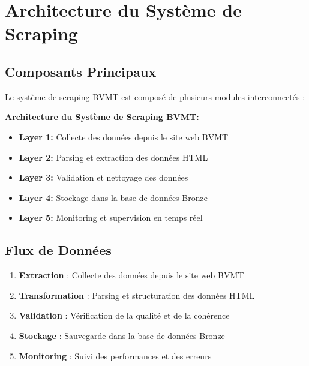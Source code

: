 \section{Architecture du Système de Scraping}

\subsection{Composants Principaux}

Le système de scraping BVMT est composé de plusieurs modules interconnectés :


\textbf{Architecture du Système de Scraping BVMT:}
\begin{itemize}
    \item \textbf{Layer 1:} Collecte des données depuis le site web BVMT
    \item \textbf{Layer 2:} Parsing et extraction des données HTML
    \item \textbf{Layer 3:} Validation et nettoyage des données
    \item \textbf{Layer 4:} Stockage dans la base de données Bronze
    \item \textbf{Layer 5:} Monitoring et supervision en temps réel
\end{itemize}

\subsection{Flux de Données}

\begin{enumerate}
    \item \textbf{Extraction} : Collecte des données depuis le site web BVMT
    \item \textbf{Transformation} : Parsing et structuration des données HTML
    \item \textbf{Validation} : Vérification de la qualité et de la cohérence
    \item \textbf{Stockage} : Sauvegarde dans la base de données Bronze
    \item \textbf{Monitoring} : Suivi des performances et des erreurs
\end{enumerate}

